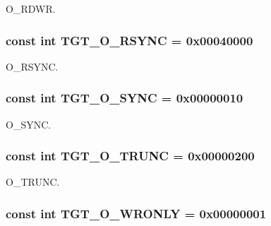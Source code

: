 O\_\-RDWR. \hypertarget{classMipsLinux_a1b4245158ffbfdc36ae7d6e666ffc261}{
\subsubsection[{TGT\_\-O\_\-RSYNC}]{\setlength{\rightskip}{0pt plus 5cm}const int {\bf TGT\_\-O\_\-RSYNC} = 0x00040000}}
\label{classMipsLinux_a1b4245158ffbfdc36ae7d6e666ffc261}


O\_\-RSYNC. \hypertarget{classMipsLinux_abf43ab05d2a5b6b8113952160d8565db}{
\subsubsection[{TGT\_\-O\_\-SYNC}]{\setlength{\rightskip}{0pt plus 5cm}const int {\bf TGT\_\-O\_\-SYNC} = 0x00000010}}
\label{classMipsLinux_abf43ab05d2a5b6b8113952160d8565db}


O\_\-SYNC. \hypertarget{classMipsLinux_a4f892ee6e1424a2becd859b0bef1f18b}{
\subsubsection[{TGT\_\-O\_\-TRUNC}]{\setlength{\rightskip}{0pt plus 5cm}const int {\bf TGT\_\-O\_\-TRUNC} = 0x00000200}}
\label{classMipsLinux_a4f892ee6e1424a2becd859b0bef1f18b}


O\_\-TRUNC. \hypertarget{classMipsLinux_a6156c069cefe05ce3cce033b2e0c2de2}{
\subsubsection[{TGT\_\-O\_\-WRONLY}]{\setlength{\rightskip}{0pt plus 5cm}const int {\bf TGT\_\-O\_\-WRONLY} = 0x00000001}}
\label{classMipsLinux_a6156c069cefe05ce3cce033b2e0c2de2}


